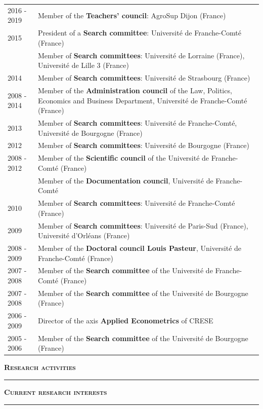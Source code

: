\documentclass[a4paper,12pt]{article}
\newcommand{\bigtitre}[1]{%
	\begin{center}
		\textbf{\LARGE \textsc{#1}}
	\end{center}
	\bigskip
	}
\newcommand{\titre}[1]{%
	\bigskip
	\noindent \rule[2mm]{\textwidth}{0.5pt}
	\textbf{\textsc{\large #1}} \\
	\noindent \rule[1mm]{\textwidth}{0.5pt}
	}
\begin{document}
\begin{longtable}{@{}p{\annee}p{\texte}@{}}
2016 - 2019	& Member of the \textbf{Teachers' council}: AgroSup Dijon (France) \\
2015	& President of a \textbf{Search committee}: Université de Franche-Comté (France) \\
		& Member of \textbf{Search committees}: Université de Lorraine (France), Université de Lille 3 (France) \\
2014	& Member of \textbf{Search committees}: Université de Strasbourg (France) \\
2008 - 2014	& Member of the \textbf{Administration council} of the Law, Politics, Economics and Business Department, Université de Franche-Comté (France) \\
2013	& Member of \textbf{Search committees}: Université de Franche-Comté, Université de Bourgogne (France) \\
2012	& Member of \textbf{Search committees}: Université de Bourgogne (France) \\
2008 - 2012 
		& Member of the \textbf{Scientific council} of the Université de Franche-Comté (France) \\
		& Member of the \textbf{Documentation council}, Université de Franche-Comté \\
2010	& Member of \textbf{Search committees}: Université de Franche-Comté (France) \\
2009	& Member of \textbf{Search committees}: Université de Paris-Sud (France), Université d'Orléans (France) \\
2008 - 2009	& Member of the \textbf{Doctoral council Louis Pasteur}, Université de Franche-Comté (France) \\
2007 - 2008	& Member of the \textbf{Search committee} of the Université de Franche-Comté (France) \\
2007 - 2008	& Member of the \textbf{Search committee} of the Université de Bourgogne (France) \\
2006 - 2009	& Director of the axis \textbf{Applied Econometrics} of CRESE \\
2005 - 2006	& Member of the \textbf{Search committee} of the Université de Bourgogne (France)
\end{longtable}



\newpage


\bigtitre{Research activities}


\titre{Current research interests}
\end{document}
